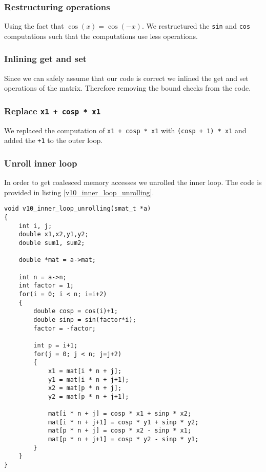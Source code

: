 \documentclass[portrait,a4paper]{article}
\begin{document}
\subsubsection{Restructuring operations}
Using the fact that $\cos(x) = \cos(-x)$.
We restructured the \lstinline{sin} and \lstinline{cos} computations such that the computations use less operations. 
\subsubsection{Inlining get and set}
Since we can safely assume that our code is correct we inlined the get and set operations of the matrix. Therefore removing the bound checks from the code.
\subsubsection{Replace \texttt{x1 + cosp * x1}}
We replaced the computation of \lstinline{x1 + cosp * x1} with \lstinline{(cosp + 1) * x1} and added the \lstinline{+1} to the outer loop.
\subsubsection{Unroll inner loop}
In order to get coalesced memory accesses we unrolled the inner loop. The code is provided in listing \ref{v10_inner_loop_unrolling}.

\lstset{language=C}
\begin{lstlisting}[caption=Improved code,label=v10_inner_loop_unrolling]
void v10_inner_loop_unrolling(smat_t *a)
{
    int i, j;
    double x1,x2,y1,y2;
    double sum1, sum2;

    double *mat = a->mat;

    int n = a->n;
    int factor = 1;
    for(i = 0; i < n; i=i+2)        
    {   
        double cosp = cos(i)+1;
        double sinp = sin(factor*i);
        factor = -factor;
        
        int p = i+1;        
        for(j = 0; j < n; j=j+2)
        {        
            x1 = mat[i * n + j];
            y1 = mat[i * n + j+1]; 
            x2 = mat[p * n + j];
            y2 = mat[p * n + j+1];

            mat[i * n + j] = cosp * x1 + sinp * x2;
            mat[i * n + j+1] = cosp * y1 + sinp * y2;
            mat[p * n + j] = cosp * x2 - sinp * x1;      
            mat[p * n + j+1] = cosp * y2 - sinp * y1;  
        }    
    }
}
\end{lstlisting}
\end{document}
